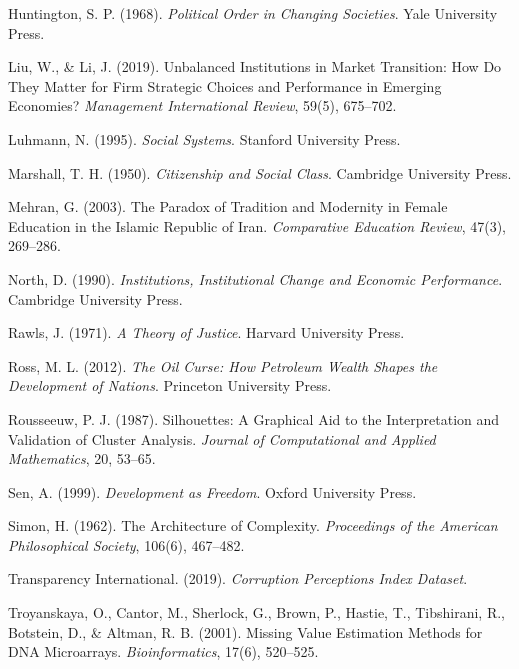 \documentclass[12pt]{article}
\begin{document}
\begin{description}
    \item Huntington, S. P. (1968). \textit{Political Order in Changing Societies}. Yale University Press.

    \item Liu, W., \& Li, J. (2019). Unbalanced Institutions in Market Transition: How Do They Matter for Firm Strategic Choices and Performance in Emerging Economies? \textit{Management International Review}, 59(5), 675–702.

    \item Luhmann, N. (1995). \textit{Social Systems}. Stanford University Press.

    \item Marshall, T. H. (1950). \textit{Citizenship and Social Class}. Cambridge University Press.

    \item Mehran, G. (2003). The Paradox of Tradition and Modernity in Female Education in the Islamic Republic of Iran. \textit{Comparative Education Review}, 47(3), 269–286.

    \item North, D. (1990). \textit{Institutions, Institutional Change and Economic Performance}. Cambridge University Press.

    \item Rawls, J. (1971). \textit{A Theory of Justice}. Harvard University Press.

    \item Ross, M. L. (2012). \textit{The Oil Curse: How Petroleum Wealth Shapes the Development of Nations}. Princeton University Press.

    \item Rousseeuw, P. J. (1987). Silhouettes: A Graphical Aid to the Interpretation and Validation of Cluster Analysis. \textit{Journal of Computational and Applied Mathematics}, 20, 53–65.

    \item Sen, A. (1999). \textit{Development as Freedom}. Oxford University Press.

    \item Simon, H. (1962). The Architecture of Complexity. \textit{Proceedings of the American Philosophical Society}, 106(6), 467–482.

    \item Transparency International. (2019). \textit{Corruption Perceptions Index Dataset}.

    \item Troyanskaya, O., Cantor, M., Sherlock, G., Brown, P., Hastie, T., Tibshirani, R., Botstein, D., \& Altman, R. B. (2001). Missing Value Estimation Methods for DNA Microarrays. \textit{Bioinformatics}, 17(6), 520–525.


\end{description}
\end{document}

